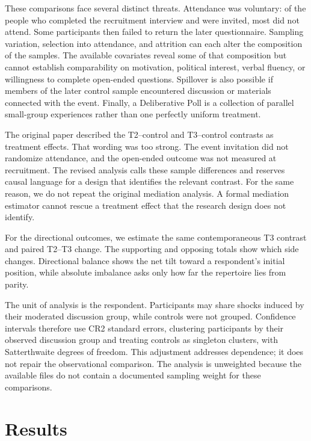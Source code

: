 \documentclass[11pt]{article}
\begin{document}
These comparisons face several distinct threats. Attendance was voluntary: of the people who
completed the recruitment interview and were invited, most did not attend. Some participants
then failed to return the later questionnaire. Sampling variation, selection into attendance,
and attrition can each alter the composition of the samples. The available covariates reveal
some of that composition but cannot establish comparability on motivation, political interest,
verbal fluency, or willingness to complete open-ended questions. Spillover is also possible if
members of the later control sample encountered discussion or materials connected with the
event. Finally, a Deliberative Poll is a collection of parallel small-group experiences rather
than one perfectly uniform treatment.

The original paper described the T2--control and T3--control contrasts as treatment effects.
That wording was too strong. The event invitation did not randomize attendance, and the
open-ended outcome was not measured at recruitment. The revised analysis calls these sample
differences and reserves causal language for a design that identifies the relevant contrast.
For the same reason, we do not repeat the original mediation analysis. A formal mediation
estimator \citep{imai2010general} cannot rescue a treatment effect that the research design
does not identify.

For the directional outcomes, we estimate the same contemporaneous T3 contrast and paired
T2--T3 change. The supporting and opposing totals show which side changes. Directional balance
shows the net tilt toward a respondent's initial position, while absolute imbalance asks only
how far the repertoire lies from parity.

The unit of analysis is the respondent. Participants may share shocks induced by their
moderated discussion group, while controls were not grouped. Confidence intervals therefore
use CR2 standard errors, clustering participants by their observed discussion group and
treating controls as singleton clusters, with Satterthwaite degrees of freedom. This
adjustment addresses dependence; it does not repair the observational comparison. The analysis
is unweighted because the available files do not contain a documented sampling weight for
these comparisons.

\section{Results}
\end{document}
